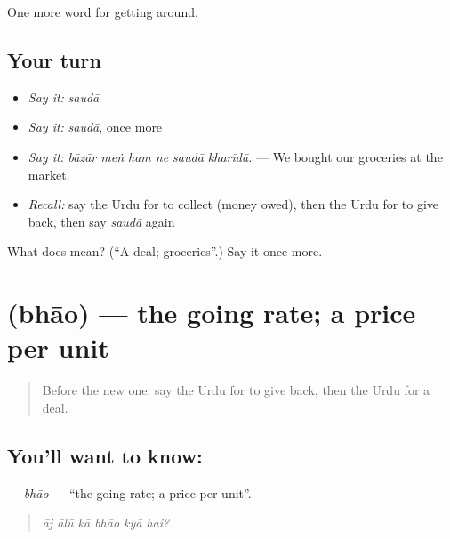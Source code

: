 \begin{grammarlens}[title={What you've built}]
One more word for getting around.
\end{grammarlens}

\subsection*{Your turn}
\begin{itemize}
\raggedright
  \item \emph{Say it:} \emph{saudā}
  \item \emph{Say it:} \emph{saudā}, once more
  \item \emph{Say it:} \emph{bāzār meṅ ham ne saudā kharīdā.} — We bought our groceries at the market.
  \item \emph{Recall:} say the Urdu for to collect (money owed), then the Urdu for to give back, then say \emph{saudā} again
\end{itemize}

\begin{tcolorbox}[breakable,colback=teal!4,colframe=teal!35!black,title={Before you move on}]
What does  mean? (\textquotedblleft{}A deal; groceries\textquotedblright{}.) Say it once more.
\end{tcolorbox}
\section[\texorpdfstring{\ur{بھاؤ} (bhāo)}{بھاؤ (bhāo)}]{ (bhāo) — the going rate; a price per unit}

\label{lesson:UR-C423-bhao}



\begin{quote}
Before the new one: say the Urdu for to give back, then the Urdu for a deal.
\end{quote}

\subsection*{You'll want to know: }
\textbf{} — \emph{bhāo} — \textquotedblleft{}the going rate; a price per unit\textquotedblright{}.

\begin{quote}
     
\end{quote}

\begin{quote}
\emph{āj ālū kā bhāo kyā hai?}
\end{quote}

